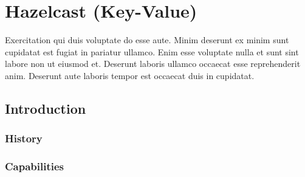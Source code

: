 
\chapter{Hazelcast (Key-Value)} \label{ch:hazelcast}

Exercitation qui duis voluptate do esse aute. Minim deserunt ex minim sunt cupidatat est fugiat in pariatur ullamco. Enim esse voluptate nulla et sunt sint labore non ut eiusmod et. Deserunt laboris ullamco occaecat esse reprehenderit anim. Deserunt aute laboris tempor est occaecat duis in cupidatat.

\section{Introduction} \label{sec:introduction}

\subsection{History} \label{subsec:history}

\subsection{Capabilities} \label{subsec:capabilities}

